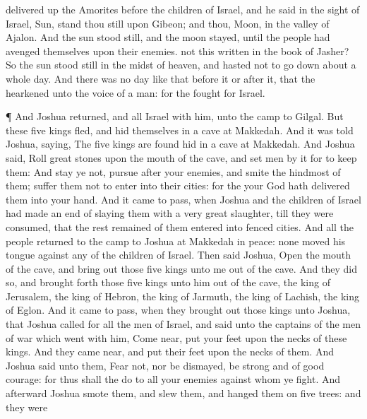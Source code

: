 {{} delivered
up the
Amorites
before the
children of
Israel, and he
said in the
sight of
Israel,
Sun, stand thou
still upon
Gibeon; and thou,
Moon, in the
valley of
Ajalon.
And the
sun stood
still, and the
moon
stayed, until the
people had
avenged themselves upon their
enemies.
{} not
this
written in the
book of
Jasher? So the
sun stood
still in the
midst of
heaven, and
hasted not to go
down about a
whole
day.
And there was no
day like that
before it or
after it, that the
{}
hearkened unto the
voice of a
man: for the
{}
fought for
Israel.
\par }{\PP {}¶ And
Joshua
returned, and all
Israel with him, unto the
camp to
Gilgal.
But these
five
kings
fled, and
hid themselves in a
cave at
Makkedah.
And it was
told
Joshua,
saying, The
five
kings are
found
hid in a
cave at
Makkedah.
And
Joshua
said,
Roll
great
stones upon the
mouth of the
cave, and
set
men by it for to
keep them:
And
stay ye not,
{}
pursue
after your
enemies, and smite the
hindmost of them;
suffer them not to
enter into their
cities: for the
{} your
God hath
delivered them into your
hand.
And it came to pass, when
Joshua and the
children of
Israel had made an
end of
slaying them with a
very
great
slaughter, till they were
consumed, that the
rest
{}
remained of them
entered into
fenced
cities.
And all the
people
returned to the
camp to
Joshua at
Makkedah in
peace: none
moved his
tongue against
any of the
children of
Israel.
Then
said
Joshua,
Open the
mouth of the
cave, and bring
out those
five
kings unto me out of the
cave.
And they
did so, and brought
forth those
five
kings unto him out of the
cave, the
king of
Jerusalem, the
king of
Hebron, the
king of
Jarmuth, the
king of
Lachish,
{} the
king of
Eglon.
And it came to pass, when they brought
out those
kings unto
Joshua, that
Joshua
called for all the
men of
Israel, and
said unto the
captains of the
men of
war which
went with him, Come
near,
put your
feet upon the
necks of these
kings. And they came
near, and
put their
feet upon the
necks of them.
And
Joshua
said unto them,
Fear not, nor be
dismayed, be
strong and of good
courage: for thus shall the
{}
do to all your
enemies against whom ye
fight.
And
afterward
Joshua
smote them, and
slew them, and
hanged them on
five
trees: and they were
}
